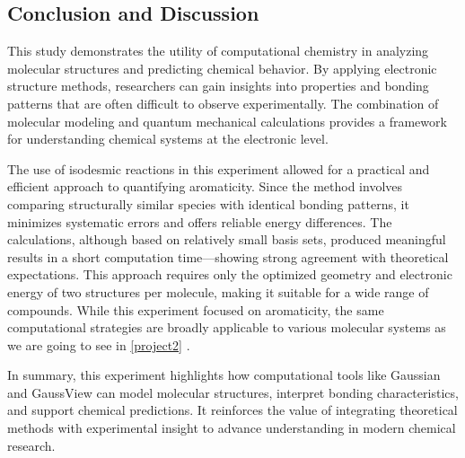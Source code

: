 \newpage
\subsection{Conclusion and Discussion}


This study demonstrates the utility of computational chemistry in analyzing molecular structures and predicting chemical behavior. By applying electronic structure methods, researchers can gain insights into properties and bonding patterns that are often difficult to observe experimentally. The combination of molecular modeling and quantum mechanical calculations provides a framework for understanding chemical systems at the electronic level.

The use of isodesmic reactions in this experiment allowed for a practical and efficient approach to quantifying aromaticity. Since the method involves comparing structurally similar species with identical bonding patterns, it minimizes systematic errors and offers reliable energy differences. The calculations, although based on relatively small basis sets, produced meaningful results in a short computation time—showing strong agreement with theoretical expectations. This approach requires only the optimized geometry and electronic energy of two structures per molecule, making it suitable for a wide range of compounds. While this experiment focused on aromaticity, the same computational strategies are broadly applicable to various molecular systems as we are going to see in \cref{project2} .

In summary, this experiment highlights how computational tools like Gaussian and GaussView can model molecular structures, interpret bonding characteristics, and support chemical predictions. It reinforces the value of integrating theoretical methods with experimental insight to advance understanding in modern chemical research.\\

\noindent\dotfill



